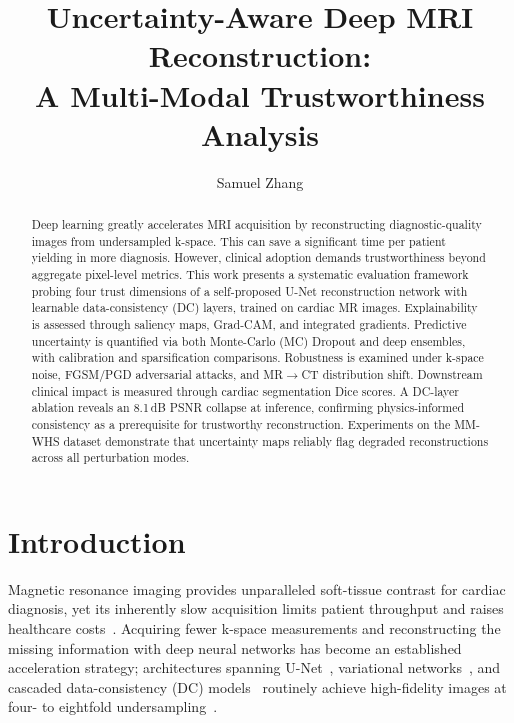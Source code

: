 \documentclass[runningheads]{llncs}
\begin{document}
\title{Uncertainty-Aware Deep MRI Reconstruction:\\ A Multi-Modal Trustworthiness Analysis}

\author{Samuel Zhang}

\maketitle

\begin{abstract}
Deep learning greatly accelerates MRI acquisition by reconstructing diagnostic-quality images from undersampled k-space. This can save a significant time per patient yielding in more diagnosis. However, clinical adoption demands trustworthiness beyond aggregate pixel-level metrics. This work presents a systematic evaluation framework probing four trust dimensions of a self-proposed U-Net reconstruction network with learnable data-consistency (DC) layers, trained on cardiac MR images. Explainability is assessed through saliency maps, Grad-CAM, and integrated gradients. Predictive uncertainty is quantified via both Monte-Carlo (MC) Dropout and deep ensembles, with calibration and sparsification comparisons. Robustness is examined under k-space noise, FGSM/PGD adversarial attacks, and MR$\to$CT distribution shift. Downstream clinical impact is measured through cardiac segmentation Dice scores. A DC-layer ablation reveals an 8.1\,dB PSNR collapse at inference, confirming physics-informed consistency as a prerequisite for trustworthy reconstruction. Experiments on the MM-WHS dataset demonstrate that uncertainty maps reliably flag degraded reconstructions across all perturbation modes.

\end{abstract}

\section{Introduction}\label{sec:intro}

Magnetic resonance imaging provides unparalleled soft-tissue contrast for cardiac diagnosis, yet its inherently slow acquisition limits patient throughput and raises healthcare costs~\cite{safari2025}. Acquiring fewer k-space measurements and reconstructing the missing information with deep neural networks has become an established acceleration strategy; architectures spanning U-Net~\cite{ronneberger2015}, variational networks~\cite{hammernik2018}, and cascaded data-consistency (DC) models~\cite{schlemper2018} routinely achieve high-fidelity images at four- to eightfold undersampling~\cite{safari2025}.
\end{document}
